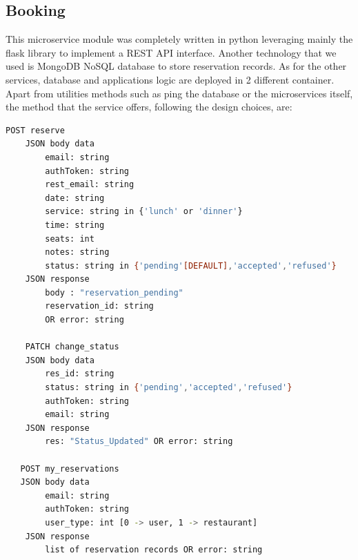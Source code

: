 \subsection{Booking}
This microservice module was completely written in python leveraging mainly the flask library to implement a REST API interface. Another technology that we used is MongoDB NoSQL database to store reservation records. As for the other services, database and applications logic are deployed in 2 different container. Apart from utilities methods such as ping the database or the microservices itself, the method that the service offers, following the design choices, are:

\begin{lstlisting}[language=bash,caption={Booking exposed API}]
    POST reserve
    JSON body data
        email: string
        authToken: string
        rest_email: string
        date: string
        service: string in {'lunch' or 'dinner'}
        time: string
        seats: int
        notes: string
        status: string in {'pending'[DEFAULT],'accepted','refused'}
    JSON response
    	body : "reservation_pending"
        reservation_id: string
        OR error: string
        
    PATCH change_status
    JSON body data
        res_id: string
        status: string in {'pending','accepted','refused'}
        authToken: string
        email: string        
    JSON response
        res: "Status_Updated" OR error: string
        
   POST my_reservations
   JSON body data
        email: string
        authToken: string
        user_type: int [0 -> user, 1 -> restaurant]
    JSON response
        list of reservation records OR error: string
\end{lstlisting}


